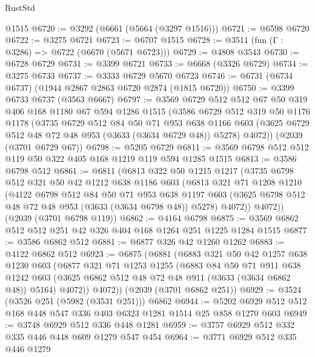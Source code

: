 \begin{lexlean}{RustStd}
\begin{coremodule}
    @1515
@6720 := @3292 (@6661 (@5664 (@3297 @1516)))
@6721 := @6598 @6720
@6722 := @3275 @6721
@6723 := @6707 @1515
@6728 := @3511 (fun (Γ : @3286) => @6722 (@6670 (@5671 @6723)))
@6729 := @4808 @3543
@6730 := @6728 @6729
@6731 := @3399 @6721
@6733 := @6668 (@3326 @6729)
@6734 := @3275 @6733
@6737 := @3333 @6729 @5670 @6723
@6746 := @6731 (@6734 @6737) (@1944 @2867 @2863 @6720 @2874 (@1815 @6720))
@6750 := @3399 @6733 @6737 (@3563 @6667)
@6797 := @3569
    @6729
    @512
    @512
    @67
    @50
    @319
    @406
    @168
    @1180
    @67
    @594
    @1286
    @1515
    (@3586
      @6729
      @512
      @319
      @50
      @1176
      @1178
      (@3735
        @6729
        @512
        @84
        @50
        @71
        @953
        @638
        @1166
        @603
        (@3625 @6729 @512 @48 @72 @48 @953 (@3633 (@3634 @6729 @48)) @5278)
        @4072))
    (@2039 (@3701 @6729 @67))
@6798 := @5205 @6729
@6811 := @3569 @6798 @512 @512 @119 @50 @322 @405 @168 @1219 @119 @594 @1285 @1515
@6813 := @3586 @6798 @512
@6861 := @6811
    (@6813
      @322
      @50
      @1215
      @1217
      (@3735
        @6798
        @512
        @321
        @50
        @42
        @1212
        @638
        @1186
        @603
        (@6813
          @321
          @71
          @1208
          @1210
          (@4122
            @6798
            @512
            @84
            @50
            @71
            @953
            @638
            @1197
            @603
            (@3625 @6798 @512 @48 @72 @48 @953 (@3633 (@3634 @6798 @48)) @5278)
            @4072))
        @4072))
    (@2039 (@3701 @6798 @119))
@6862 := @4164 @6798
@6875 := @3569 @6862 @512 @512 @251 @42 @326 @404 @168 @1264 @251 @1225 @1284 @1515
@6877 := @3586 @6862 @512
@6881 := @6877 @326 @42 @1260 @1262
@6883 := @4122 @6862 @512
@6923 := @6875
    (@6881
      (@6883
        @321
        @50
        @42
        @1257
        @638
        @1230
        @603
        (@6877
          @321
          @71
          @1253
          @1255
          (@6883
            @84
            @50
            @71
            @911
            @638
            @1242
            @603
            (@3625 @6862 @512 @48 @72 @48 @911 (@3633 (@3634 @6862 @48)) @5164)
            @4072))
        @4072))
    (@2039 (@3701 @6862 @251))
@6929 := @3524 (@3526 @251 (@5982 (@3531 @251))) @6862
@6944 := @5202 @6929 @512 @512 @168 @448 @547 @336 @403 @6323 @1281 @1514 @25 @858 @1270 @603
@6949 := @3748 @6929 @512 @336 @448 @1281
@6959 := @3757 @6929 @512 @332 @335 @446 @448 @609 @1279 @547 @454
@6964 := @3771 @6929 @512 @335 @446 @1279

\end{coremodule}
\end{lexlean}
